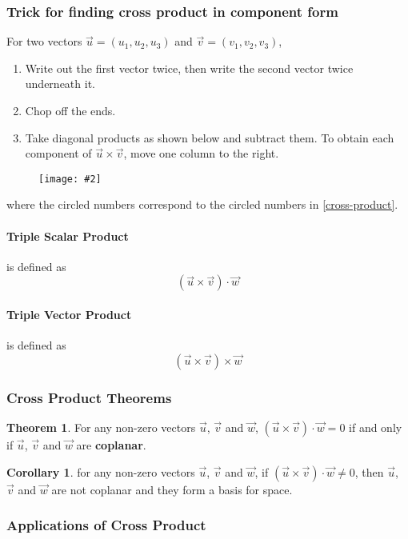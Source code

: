 \documentclass{report}
\newcommand{\diagram}[2][0.5]{
	\begin{figure}[H]
		\centering
		\texttt{[image: \#2]}
	\end{figure}
	}
\theoremstyle{definition}
\newtheorem{thm}{Theorem}[section]
\newtheorem{cor}{Corollary}[thm]
\numberwithin{equation}{section}
\begin{document}
\subsubsection*{Trick for finding cross product in component form}
For two vectors $\vec u = (u_1,u_2,u_3)$ and $\vec v = (v_1,v_2,v_3)$,
\begin{enumerate}
	\item Write out the first vector twice, then write the second vector twice underneath it.
	\item Chop off the ends.
	\item Take diagonal products as shown below and subtract them. To obtain each component of $\vec u \times \vec v$, move one column to the right.
\end{enumerate}
\diagram[0.7]{cross-product}
where the circled numbers correspond to the circled numbers in \eqref{cross-product}.

\paragraph{Triple Scalar Product} is defined as
\begin{equation}
	( \vec u \times \vec v ) \cdot \vec w
\end{equation}

\paragraph{Triple Vector Product} is defined as
\begin{equation}
	( \vec u \times \vec v ) \times \vec w
\end{equation}

\subsubsection{Cross Product Theorems}
\begin{thm}
	For any non-zero vectors $\vec u$, $\vec v$ and $\vec w$, $(\vec u \times \vec v) \cdot \vec w = 0$ if and only if $\vec u$, $\vec v$ and $\vec w$ are \textbf{coplanar}.
\end{thm}
\begin{cor}
	for any non-zero vectors $\vec u$, $\vec v$ and $\vec w$, if $(\vec u \times \vec v) \cdot \vec w \ne 0$, then $\vec u$, $\vec v$ and $\vec w$ are not coplanar and they form a basis for space.
\end{cor}

\subsubsection{Applications of Cross Product}
\end{document}
